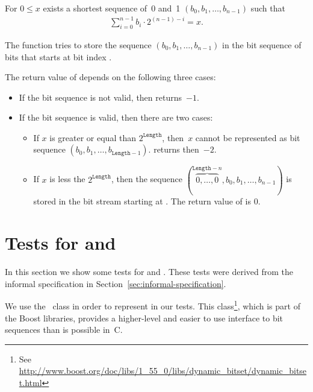 For $0 \leq x$ exists a shortest sequence of~0 and~1
$(b_0, b_1,\ldots,b_{n - 1})$
such that
\begin{align}
    \sum_{i=0}^{n-1} b_i \cdot 2^{(n - 1) - i} = x.
\end{align}

The function \poke tries to store the sequence $(b_0, b_1,\ldots,b_{n - 1})$
in the bit sequence of  bits that starts
at bit index .

The return value of \poke depends on the following three cases:

\begin{itemize}
\item 
If the bit sequence is not valid, then \poke returns~$-1$.

\item 
If the bit sequence is valid, then there are two cases:

\begin{itemize}
\item
If $x$ is greater or equal than $2^\mathtt{Length}$, then~$x$
cannot be represented as bit sequence $(b_0, b_1,\ldots,b_{\mathtt{Length} - 1})$.
\poke returns then~$-2$.

\item
If $x$ is less the $2^{\mathtt{Length}}$, then  the sequence
$(\overbrace{0,\ldots,0}^{\mathtt{Length}-n},b_0, b_1,\ldots,b_{n - 1})$
is stored in the bit stream starting at .
The return value of \poke is 0.

\end{itemize}
\end{itemize}

\clearpage

\section{Tests for \peek and \poke}
\label{sec:bitwalker-tests}

In this section we show some tests for \peek and \poke.
These tests were derived from the informal specification in 
Section~\ref{sec:informal-specification}.

We use the \CC\ class  in order to represent
 in our tests.
This class\footnote{
  See \url{http://www.boost.org/doc/libs/1_55_0/libs/dynamic_bitset/dynamic_bitset.html}
},
which is part of the \textsf{Boost} libraries,
provides a higher-level and easier to use interface to bit sequences than is possible in~C.

